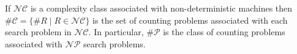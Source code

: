 \documentclass[12pt]{article}
\begin{document}
If $\mathcal{NC}$ is a complexity class associated with non-deterministic machines then $\mathcal{\#C}=\{\#R\mid R\in\mathcal{NC}\}$ is the set of counting problems associated with each search problem in $\mathcal{NC}$.  In particular, $\mathcal{\#P}$ is the class of counting problems associated with $\mathcal{NP}$ search problems.
\end{document}
